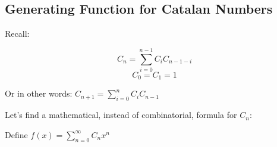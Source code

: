 \label{21-0321-2}

% 






% 



\noindent

\subsection{Generating Function for Catalan Numbers}

Recall:

$$C_n = \sum_{i=0}^{n-1} C_i C_{n-1-i} $$ $$ C_0 = C_1 = 1$$

Or in other words: $C_{n+1} = \sum_{i=0}^{n} C_i C_{n-1}$

\bigbreak

\bigbreak

\noindent
Let's find a mathematical, instead of combinatorial, formula for $C_n$:

\smallbreak

\noindent Define $f(x) = \sum_{n=0}^{\infty} C_n x^n$

